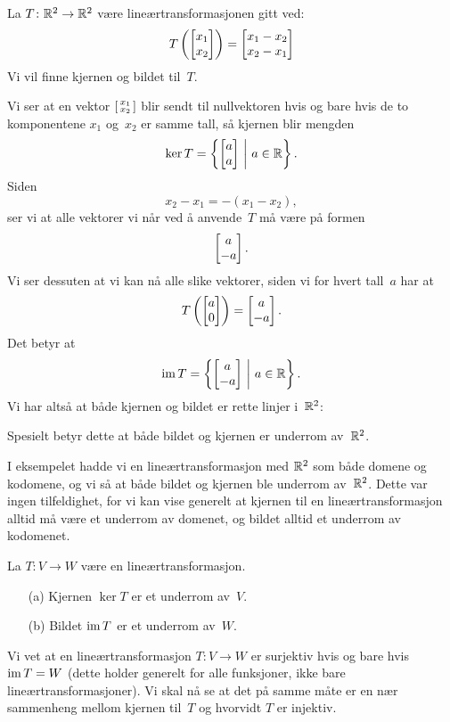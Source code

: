 \begin{ex}
La $T \colon \mathbb{R}^2 \to \mathbb{R}^2$ være lineærtransformasjonen gitt ved:
\[
T \left( \begin{bmatrix} x_1 \\ x_2 \end{bmatrix} \right) = \begin{bmatrix} x_1-x_2 \\ x_2-x_1 \end{bmatrix}
\]
Vi vil finne kjernen og bildet til~$T$.

Vi ser at en vektor $\left[ \begin{smallmatrix} x_1 \\ x_2 \end{smallmatrix} \right]$ blir sendt til nullvektoren hvis
og bare hvis de to komponentene $x_1$ og~$x_2$ er samme tall, så
kjernen blir mengden
\[
\ker T = \left\{ \begin{bmatrix} a \\ a \end{bmatrix}\ \middle|\ a \in \mathbb{R} \right\}.
\]
Siden
\[
x_2 - x_1 = - (x_1 - x_2),
\]
ser vi at alle vektorer vi når ved å anvende~$T$ må være på formen
\[
\begin{bmatrix} a \\ -a \end{bmatrix}.
\]
Vi ser dessuten at vi kan nå alle slike vektorer, siden vi for hvert
tall~$a$ har at
\[
T \left( \begin{bmatrix} a \\ 0 \end{bmatrix} \right) = \begin{bmatrix} a \\ -a \end{bmatrix}.
\]
Det betyr at
\[
\operatorname{im} T = \left\{ \begin{bmatrix} a \\ -a \end{bmatrix}\ \middle|\ a \in \mathbb{R} \right\}.
\]
Vi har altså at både kjernen og bildet er rette linjer i~$\mathbb{R}^2$:
\begin{center}
\end{center}
Spesielt betyr dette at både bildet og kjernen er underrom av~$\mathbb{R}^2$.
\end{ex}

I eksempelet hadde vi en lineærtransformasjon med $\mathbb{R}^2$ som både
domene og kodomene, og vi så at både bildet og kjernen ble underrom
av~$\mathbb{R}^2$.  Dette var ingen tilfeldighet, for vi kan vise generelt at
kjernen til en lineærtransformasjon alltid må være et underrom av
domenet, og bildet alltid et underrom av kodomenet.

\begin{thm}
La $T \colon V \to W$ være en lineærtransformasjon.
\begin{enumerate}
\item[(a)] Kjernen $\ker T$ er et underrom av~$V$.
\item[(b)] Bildet $\operatorname{im} T$ er et underrom av~$W$.
\end{enumerate}
\end{thm}

Vi vet at en lineærtransformasjon $T \colon V \to W$ er surjektiv hvis
og bare hvis $\operatorname{im} T = W$ (dette holder generelt for alle funksjoner,
ikke bare lineærtransformasjoner).  Vi skal nå se at det på samme måte
er en nær sammenheng mellom kjernen til~$T$ og hvorvidt $T$ er
injektiv.

